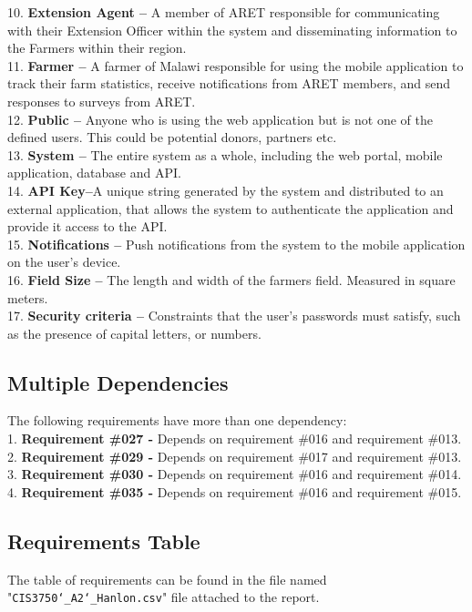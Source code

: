 \documentclass[12pt,letterpaper]{article}
\begin{document}
10. \textbf{Extension Agent --} A member of ARET responsible for communicating with their Extension Officer within the system and disseminating information to the Farmers within their region.\\
11. \textbf{Farmer --} A farmer of Malawi responsible for using the mobile application to track their farm statistics, receive notifications from ARET members, and send responses to surveys from ARET.\\
12. \textbf{Public --} Anyone who is using the web application but is not one of the defined users. This could be potential donors, partners etc.\\
13. \textbf{System --} The entire system as a whole, including the web portal, mobile application, database and API.\\
14. \textbf{API Key--}A unique string generated by the system and distributed to an external application, that allows the system to authenticate the application and provide it access to the API.\\
15. \textbf{Notifications --} Push notifications from the system to the mobile application on the user's device.\\
16. \textbf{Field Size --} The length and width of the farmers field. Measured in square meters. \\
17. \textbf{Security criteria --} Constraints that the user's passwords must satisfy, such as the presence of capital letters, or numbers.

\subsection{Multiple Dependencies}
The following requirements have more than one dependency: \\
1. \textbf{Requirement \#027 -} Depends on requirement \#016 and requirement \#013. \\
2. \textbf{Requirement \#029 -} Depends on requirement \#017 and requirement \#013. \\
3. \textbf{Requirement \#030 -} Depends on requirement \#016 and requirement \#014. \\
4. \textbf{Requirement \#035 -} Depends on requirement \#016 and requirement \#015.

\subsection{Requirements Table}
The table of requirements can be found in the file named "\texttt{CIS3750\char`_A2\char`_Hanlon.csv}" file attached to the report.
\end{document}
